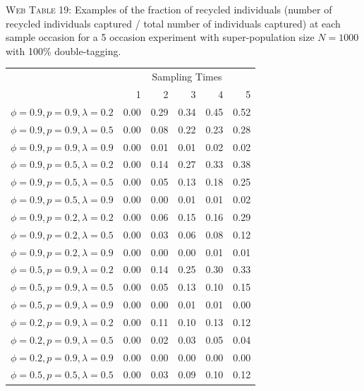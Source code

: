 \documentclass[]{article}
\begin{document}
\clearpage

\textsc{Web Table 19:} Examples of the fraction of recycled individuals
(number of recycled individuals captured / total number of individuals
captured) at each sample occasion for a 5 occasion experiment with
super-population size \(N=1000\) with 100\% double-tagging.

\begin{table}[ht]
\begin{tabular}{rrrrrr}
  \hline
  & \multicolumn{5}{c}{Sampling Times}\\
 & 1 & 2 & 3 & 4 & 5 \\ 
  \hline
 $\phi=0.9, p=0.9, \lambda=0.2$  & 0.00 & 0.29 & 0.34 & 0.45 & 0.52 \\ 
  $\phi=0.9, p=0.9, \lambda=0.5$  & 0.00 & 0.08 & 0.22 & 0.23 & 0.28 \\ 
  $\phi=0.9, p=0.9, \lambda=0.9$  & 0.00 & 0.01 & 0.01 & 0.02 & 0.02 \\ \hline 
  $\phi=0.9, p=0.5, \lambda=0.2$  & 0.00 & 0.14 & 0.27 & 0.33 & 0.38 \\ 
  $\phi=0.9, p=0.5, \lambda=0.5$  & 0.00 & 0.05 & 0.13 & 0.18 & 0.25 \\ 
  $\phi=0.9, p=0.5, \lambda=0.9$  & 0.00 & 0.00 & 0.01 & 0.01 & 0.02 \\ \hline
  $\phi=0.9, p=0.2, \lambda=0.2$  & 0.00 & 0.06 & 0.15 & 0.16 & 0.29 \\ 
  $\phi=0.9, p=0.2, \lambda=0.5$ & 0.00 & 0.03 & 0.06 & 0.08 & 0.12 \\ 
  $\phi=0.9, p=0.2, \lambda=0.9$ & 0.00 & 0.00 & 0.00 & 0.01 & 0.01 \\ \hline
  $\phi=0.5, p=0.9, \lambda=0.2$ & 0.00 & 0.14 & 0.25 & 0.30 & 0.33 \\ 
  $\phi=0.5, p=0.9, \lambda=0.5$ & 0.00 & 0.05 & 0.13 & 0.10 & 0.15 \\ 
  $\phi=0.5, p=0.9, \lambda=0.9$ & 0.00 & 0.00 & 0.01 & 0.01 & 0.00 \\ \hline
  $\phi=0.2, p=0.9, \lambda=0.2$ & 0.00 & 0.11 & 0.10 & 0.13 & 0.12 \\ 
  $\phi=0.2, p=0.9, \lambda=0.5$  & 0.00 & 0.02 & 0.03 & 0.05 & 0.04 \\ 
  $\phi=0.2, p=0.9, \lambda=0.9$  & 0.00 & 0.00 & 0.00 & 0.00 & 0.00 \\ \hline
    $\phi=0.5, p=0.5, \lambda=0.5$ & 0.00 & 0.03 & 0.09 & 0.10 & 0.12 \\ \hline
\end{tabular}
\end{table}
\end{document}
